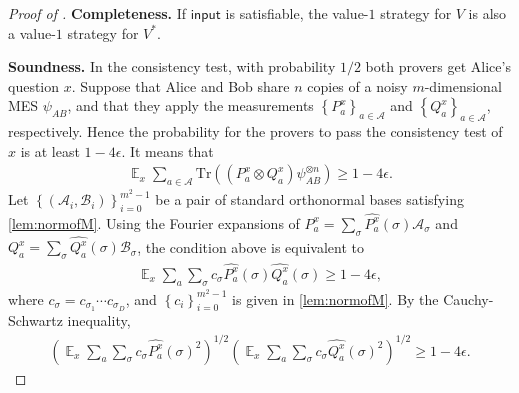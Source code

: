 \documentclass[11pt]{article}
\theoremstyle{plain}
\theoremstyle{definition}
\newcommand {\set} [1] {\ensuremath{ \left\lbrace #1 \right\rbrace }}
\newcommand {\br} [1] {\ensuremath{ \left( #1 \right) }}
\DeclareMathOperator*{\bigE}{\mathbb{E}}
\newcommand {\Tr} {\ensuremath{ \mathrm{Tr} }}
\newcommand{\calA}{\mathcal{A}}
\newcommand{\calB}{\mathcal{B}}
\newcommand{\1}{\mathbb{1}} %
\newcommand{\ipt}{\mathsf{input}}
\begin{document}
\begin{proof}[Proof of ]
    \textbf{Completeness.} If $\ipt$ is satisfiable, the value-$1$ strategy for $V$ is also a value-$1$ strategy for $V^*$.

    \textbf{Soundness.} In the consistency test, with probability $1/2$ both provers get Alice's question $x$. Suppose that Alice and Bob share $n$ copies of a noisy $m$-dimensional MES $\psi_{AB}$, and that they apply the measurements $\set{P^x_a}_{a\in\calA}$ and $\set{Q^x_a}_{a\in\calA}$, respectively. Hence the probability for the provers to pass the consistency test of $x$ is at least $1 - 4\epsilon$.
     It means that    
\begin{align*}
    \bigE_{x} \sum_{a \in \calA} \Tr\br{\br{P^x_a \otimes Q^x_a} \psi_{AB}^{\otimes n}} \geq 1 - 4\epsilon.
\end{align*}
    Let $\set{\br{\calA_i,\calB_i}}_{i=0}^{m^2-1}$ be a pair of standard orthonormal bases satisfying \cref{lem:normofM}. Using the Fourier expansions of $P^x_a = \sum_\sigma \widehat{P^x_a}\br{\sigma}\calA_{\sigma}$ and $Q^x_a = \sum_\sigma \widehat{Q^x_a}\br{\sigma}\calB_{\sigma}$, the condition above is equivalent to 
\begin{align*}
\bigE_x \sum_a \sum_\sigma c_{\sigma} \widehat{P^x_a}\br{\sigma}\widehat{Q^x_a}\br{\sigma} \geq 1 - 4\epsilon,
\end{align*}
where $c_{\sigma}=c_{\sigma_1}\cdots c_{\sigma_D}$, and $\set{c_i}_{i=0}^{m^2-1}$ is given in \cref{lem:normofM}. By the Cauchy-Schwartz inequality,
\begin{align*}
\br{\bigE_x \sum_a \sum_\sigma c_{\sigma} \widehat{P^x_a}\br{\sigma}^2}^{1/2}\br{\bigE_x \sum_a \sum_\sigma c_{\sigma} \widehat{Q^x_a}\br{\sigma}^2}^{1/2}\geq1-4\epsilon.
\end{align*}


\end{proof}
\end{document}
